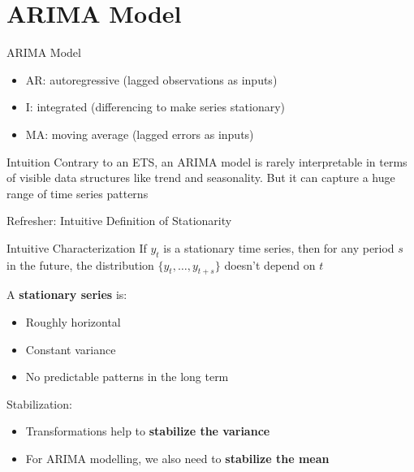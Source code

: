 \documentclass{beamer}
\begin{document}
\section{ARIMA Model}


\begin{frame}{ARIMA Model}

  \begin{itemize}
  \item AR: autoregressive (lagged observations as inputs)
  \item I: integrated (differencing to make series stationary)
  \item MA: moving average (lagged errors as inputs)
  \end{itemize}

  \begin{block}{Intuition}
    Contrary to an ETS, an ARIMA model is rarely interpretable in terms of visible data structures like trend and seasonality. But it can capture a huge range of time series patterns
  \end{block}  
\end{frame}


\begin{frame}{Refresher: Intuitive Definition of Stationarity}

  \begin{block}{Intuitive Characterization}
    If ${y_t}$ is a stationary time series, then for any period $s$ in the future, the distribution $\{y_t, \dots, y_{t+s}\}$ doesn't depend on $t$
  \end{block}

  A \textbf{stationary series} is:
  \begin{itemize}
  \item Roughly horizontal
  \item Constant variance
  \item No predictable patterns in the long term
  \end{itemize}

  Stabilization: 
  \begin{itemize}
  \item Transformations help to \textbf{stabilize the variance}
  \item For ARIMA modelling, we also need to \textbf{stabilize the mean}
  \end{itemize}
  
\end{frame}
\end{document}
